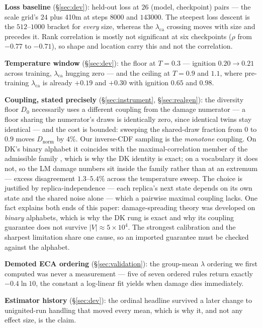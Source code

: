 \documentclass{article}
\newcommand{\dn}{\ensuremath{D_{\mathrm{norm}}}}
\newcommand{\dz}{\ensuremath{D_0}}
\newcommand{\lca}{\ensuremath{\lambda_{\mathrm{ca}}}}
\begin{document}
\textbf{Loss baseline} (\S\ref{sec:dev}): held-out loss at $26$ (model, checkpoint) pairs --- the
scale grid's $24$ plus 410m at steps $8000$ and $143000$. The steepest loss descent is the
$512$--$1000$ bracket for \emph{every} size, whereas the \lca{} crossing moves with size and
precedes it. Rank correlation is mostly not significant at six checkpoints ($\rho$ from $-0.77$
to $-0.71$), so shape and location carry this and not the correlation.

\textbf{Temperature window} (\S\ref{sec:dev}): the floor at $T{=}0.3$ --- ignition
$0.20\to0.21$ across training, \lca{} hugging zero --- and the ceiling at $T{=}0.9$ and $1.1$,
where pre-training \lca{} is already ${+}0.19$ and ${+}0.30$ with ignition $0.65$ and $0.98$.

\textbf{Coupling, stated precisely} (\S\ref{sec:instrument}, \S\ref{sec:realgen}): the
diversity floor \dz{} necessarily uses a different coupling from the damage numerator --- a floor
sharing the numerator's draws is identically zero, since identical twins stay identical --- and
the cost is bounded: sweeping the shared-draw fraction from $0$ to $0.9$ moves \dn{} by $4\%$.
Our inverse-CDF sampling is the
\emph{monotone} coupling. On DK's binary alphabet it coincides with the maximal-correlation
member of the admissible family \citep{hinrichsen1997}, which is why the DK identity is exact;
on a vocabulary it does not, so the LM damage numbers sit inside the family rather than at an
extremum --- excess disagreement $1.3$--$5.4\%$ across the temperature sweep. The choice is
justified by replica-independence --- each replica's next state depends on its own state and the
shared noise alone --- which a pairwise maximal coupling lacks. One fact explains both ends of
this paper: damage-spreading theory was developed on \emph{binary} alphabets, which is why the
DK rung is exact and why its coupling guarantee does not survive $|V|\approx5\times10^{4}$. The
strongest calibration and the sharpest limitation share one cause, so an imported guarantee must
be checked against the alphabet.

\textbf{Demoted ECA ordering} (\S\ref{sec:validation}): the group-mean $\lambda$ ordering we
first computed was never a measurement --- five of seven ordered rules return exactly
$-0.4\ln10$, the constant a log-linear fit yields when damage dies immediately.

\textbf{Estimator history} (\S\ref{sec:dev}): the ordinal headline survived a later change to
unignited-run handling that moved every mean, which is why it, and not any effect size, is the
claim.


\end{document}

